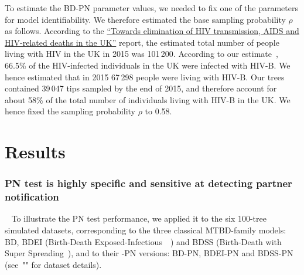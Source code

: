 \documentclass[10pt,letterpaper]{article}
\begin{document}
To estimate the BD-PN parameter values, we needed to fix one of the parameters for model identifiability. We therefore estimated the base sampling probability $\rho$ as follows. According to the \href{https://webarchive.nationalarchives.gov.uk/ukgwa/20181112132123mp_/https://assets.publishing.service.gov.uk/government/uploads/system/uploads/attachment_data/file/602942/HIV_in_the_UK_report.pdf}{``Towards elimination of HIV transmission, AIDS and HIV-related deaths in the UK''}
 report, the estimated total number of people living with HIV in the UK in 2015 was 101\,200. %
According to our estimate~\cite{zhukovaModelingDrugResistance2023}, 66.5\% of the HIV-infected individuals in the UK were infected with HIV-B. We hence estimated that in 2015 67\,298 %
people were living with HIV-B. Our trees contained 39\,047 tips sampled by the end of 2015, and therefore account for about 58\% %
of the total number of individuals living with HIV-B in the UK. We hence fixed the sampling probability $\rho$ to 0.58. %
 

\section*{Results}


\subsubsection*{PN test is highly specific and sensitive at detecting partner notification}~\label{sec:test:sim}
To illustrate the PN test performance, we applied it to the six 100-tree simulated datasets, corresponding to the three classical MTBD-family models: BD, BDEI (Birth-Death Exposed-Infectious~~\cite{Stadler2014}) and BDSS (Birth-Death with Super Spreading~\cite{Stadler2013a}), and to their -PN versions: BD-PN, BDEI-PN and BDSS-PN (see~"" for dataset details).
\end{document}
